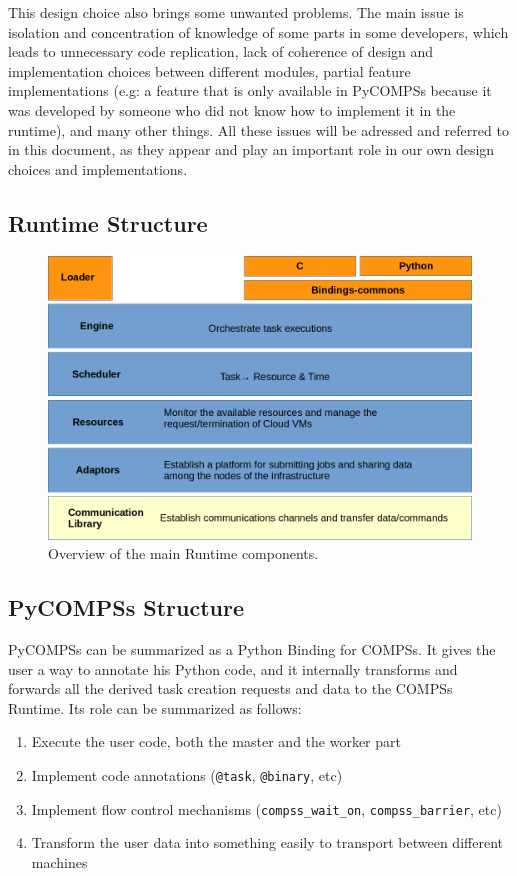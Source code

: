 This design choice also brings some unwanted problems. The main issue is isolation and concentration of knowledge of some parts in some developers, which leads to unnecessary code replication, lack of coherence of design and implementation choices between different modules, partial feature implementations (e.g: a feature that is only available in PyCOMPSs because it was developed by someone who did not know how to implement it in the runtime), and many other things. All these issues will be adressed and referred to in this document, as they appear and play an important role in our own design choices and implementations.

\subsection{Runtime Structure}
\label{subsec:runtime_structure}

\begin{figure}
\centering
\includegraphics[scale = 0.45]{figures/runtime_modules.png}
\caption{Overview of the main Runtime components.}
\label{fig:runtime_modules}
\end{figure}

\subsection{PyCOMPSs Structure}
\label{subsec:pycompss_structure}
PyCOMPSs can be summarized as a Python Binding for COMPSs. It gives the user a way to annotate his Python code, and it internally transforms and forwards all the derived task creation requests and data to the COMPSs Runtime. Its role can be summarized as follows:
\begin{enumerate}
\item Execute the user code, both the master and the worker part
\item Implement code annotations (\verb|@task|, \verb|@binary|, etc)
\item Implement flow control mechanisms (\verb|compss_wait_on|, \verb|compss_barrier|, etc)
\item Transform the user data into something easily to transport between different machines
\end{enumerate}

